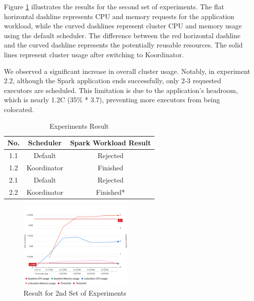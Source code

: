 Figure \ref{fig:res-1} illustrates the results for the second set of experiments. The flat horizontal dashline represents CPU and memory requests for the application workload, while the curved dashlines represent cluster CPU and memory usage using the default scheduler. The difference between the red horizontal dashline and the curved dashline represents the potentially reusable resources. The solid lines represent cluster usage after switching to Koordinator.

We observed a significant increase in overall cluster usage. Notably, in experiment 2.2, although the Spark application ends successfully, only 2-3 requested executors are scheduled. This limitation is due to the application's headroom, which is nearly 1.2C (35\% * 3.7), preventing more executors from being colocated.

\begin{table}[h]
	\centering
	\begin{tabular}{ccc}
		No. & Scheduler   & Spark Workload Result \\
		\hline
		1.1   & Default     & Rejected              \\
		1.2   & Koordinator & Finished              \\
		2.1   & Default     & Rejected              \\
		2.2   & Koordinator & Finished*
	\end{tabular}
	\caption{Experiments Result}
	\label{tab:res}
\end{table}

\begin{figure}[h]
	\centering
	\includegraphics[width=0.5\textwidth]{img-eva-expr1.png}
	\caption{Result for 2nd Set of Experiments}
	\label{fig:res-1}
\end{figure}
